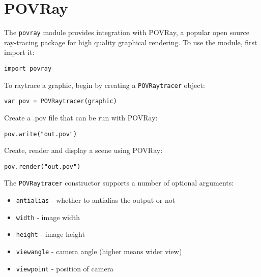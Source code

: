 \hypertarget{povray}{%
\section{POVRay}\label{povray}}

The \texttt{povray} module provides integration with POVRay, a popular
open source ray-tracing package for high quality graphical rendering. To
use the module, first import it:

\begin{lstlisting}
import povray
\end{lstlisting}

To raytrace a graphic, begin by creating a \texttt{POVRaytracer} object:

\begin{lstlisting}
var pov = POVRaytracer(graphic)
\end{lstlisting}

Create a .pov file that can be run with POVRay:

\begin{lstlisting}
pov.write("out.pov")
\end{lstlisting}

Create, render and display a scene using POVRay:

\begin{lstlisting}
pov.render("out.pov")
\end{lstlisting}

The \texttt{POVRaytracer} constructor supports a number of optional
arguments:

\begin{itemize}

\item
  \texttt{antialias} - whether to antialias the output or not
\item
  \texttt{width} - image width
\item
  \texttt{height} - image height
\item
  \texttt{viewangle} - camera angle (higher means wider view)
\item
  \texttt{viewpoint} - position of camera
\end{itemize}
